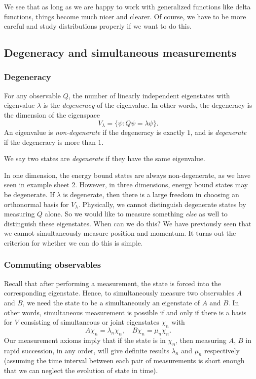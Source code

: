 \documentclass[a4paper]{article}
\begin{document}
We see that as long as we are happy to work with generalized functions like delta functions, things become much nicer and clearer. Of course, we have to be more careful and study distributions properly if we want to do this.

\subsection{Degeneracy and simultaneous measurements}
\subsubsection*{Degeneracy}
\begin{defi}[Degeneracy]
  For any observable $Q$, the number of linearly independent eigenstates with eigenvalue $\lambda$ is the \emph{degeneracy} of the eigenvalue. In other words, the degeneracy is the dimension of the eigenspace
  \[
    V_\lambda = \{\psi: Q \psi = \lambda \psi\}.
  \]
  An eigenvalue is \emph{non-degenerate} if the degeneracy is exactly $1$, and is \emph{degenerate} if the degeneracy is more than $1$.

  We say two states are \emph{degenerate} if they have the same eigenvalue.
\end{defi}
In one dimension, the energy bound states are always non-degenerate, as we have seen in example sheet 2. However, in three dimensions, energy bound states may be degenerate. If $\lambda$ is degenerate, then there is a large freedom in choosing an orthonormal basis for $V_\lambda$. Physically, we cannot distinguish degenerate states by measuring $Q$ alone. So we would like to measure something \emph{else} as well to distinguish these eigenstates. When can we do this? We have previously seen that we cannot simultaneously measure position and momentum. It turns out the criterion for whether we can do this is simple.

\subsubsection*{Commuting observables}
Recall that after performing a measurement, the state is forced into the corresponding eigenstate. Hence, to simultaneously measure two observables $A$ and $B$, we need the state to be a simultaneously an eigenstate of $A$ and $B$. In other words, simultaneous measurement is possible if and only if there is a basis for $V$ consisting of simultaneous or joint eigenstates $\chi_n$ with
\[
  A \chi_n = \lambda_n \chi_n,\quad B \chi_n = \mu_n \chi_n.
\]
Our measurement axioms imply that if the state is in $\chi_n$, then measuring $A$, $B$ in rapid succession, in any order, will give definite results $\lambda_n$ and $\mu_n$ respectively (assuming the time interval between each pair of measurements is short enough that we can neglect the evolution of state in time).
\end{document}
